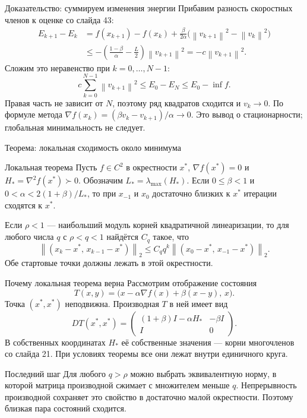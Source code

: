 \documentclass[aspectratio=169,10pt]{beamer}
\newcommand{\norm}[1]{\left\lVert #1\right\rVert}
\newcommand{\grad}{\nabla}
\begin{document}
\begin{frame}{Доказательство: суммируем изменения энергии}
\scriptsize
Прибавим разность скоростных членов к оценке со слайда 43:
\[
\begin{aligned}
E_{k+1}-E_k
&=f(x_{k+1})-f(x_k)
+\frac{\beta}{2\alpha}\bigl(\norm{v_{k+1}}^2-\norm{v_k}^2\bigr)\\
&\le-\left(\frac{1-\beta}{\alpha}-\frac L2\right)\norm{v_{k+1}}^2
=-c\norm{v_{k+1}}^2.
\end{aligned}
\]
Сложим это неравенство при $k=0,\ldots,N-1$:
\[
c\sum_{k=0}^{N-1}\norm{v_{k+1}}^2\le E_0-E_N\le E_0-\inf f.
\]
Правая часть не зависит от $N$, поэтому ряд квадратов сходится и $v_k\to0$.
По формуле метода
$\grad f(x_k)=(\beta v_k-v_{k+1})/\alpha\to0$.
Это вывод о стационарности; глобальная минимальность не следует.
\end{frame}

\begin{frame}{Теорема: локальная сходимость около минимума}
\small
\begin{block}{Локальная теорема}
Пусть $f\in C^2$ в окрестности $x^*$, $\grad f(x^*)=0$ и
$H_*=\grad^2f(x^*)\succ0$. Обозначим $L_*=\lambda_{\max}(H_*)$.
Если $0\le\beta<1$ и $0<\alpha<2(1+\beta)/L_*$, то при $x_{-1}$ и $x_0$ достаточно близких к $x^*$ итерации сходятся к $x^*$.
\end{block}
Если $\rho<1$ --- наибольший модуль корней квадратичной линеаризации, то для любого числа $q$ с $\rho<q<1$ найдётся $C_q$ такое, что
\[
\norm{(x_k-x^*,\,x_{k-1}-x^*)}_2
\le C_q q^k\norm{(x_0-x^*,\,x_{-1}-x^*)}_2.
\]
Обе стартовые точки должны лежать в этой окрестности.
\end{frame}

\begin{frame}{Почему локальная теорема верна}
\small
Рассмотрим отображение состояния
\[
T(x,y)=\bigl(x-\alpha\grad f(x)+\beta(x-y),\,x\bigr).
\]
Точка $(x^*,x^*)$ неподвижна. Производная $T$ в ней имеет вид
\[
DT(x^*,x^*)=
\begin{pmatrix}
(1+\beta)I-\alpha H_*&-\beta I\\ I&0
\end{pmatrix}.
\]
В собственных координатах $H_*$ её собственные значения --- корни многочленов со слайда 21. При условиях теоремы все они лежат внутри единичного круга.
\begin{block}{Последний шаг}
Для любого $q>\rho$ можно выбрать эквивалентную норму, в которой матрица производной сжимает с множителем меньше $q$. Непрерывность производной сохраняет это свойство в достаточно малой окрестности. Поэтому близкая пара состояний сходится.
\end{block}
\end{frame}
\end{document}
